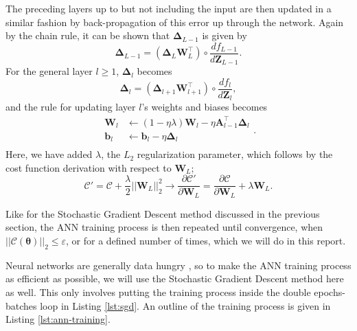 \documentclass[]{article}
\begin{document}
The preceding layers up to but not including the input are then updated in a similar fashion by back-propagation of this error up through the network. Again by the chain rule, it can be shown that $\mathbf{\Delta}_{L-1}$ is given by
\begin{equation}
	\mathbf{\Delta}_{L-1} = (\mathbf{\Delta}_L \mathbf{W}_L^\intercal) \circ \frac{df_{L-1}}{d\mathbf{Z}_{L-1}}.
\end{equation}
For the general layer $l \ge 1$, $\mathbf{\Delta}_l$ becomes
\begin{equation} \label{update-deltas}
	\mathbf{\Delta}_{l} = (\mathbf{\Delta}_{l+1} \mathbf{W}_{l+1}^\intercal) \circ \frac{df_l}{d\mathbf{Z}_l},
\end{equation}
and the rule for updating layer $l$'s weights and biases becomes
\begin{equation} \label{update-weights-biases}
\begin{aligned}
	\mathbf{W}_l &\leftarrow (1 - \eta \lambda) \mathbf{W}_l - \eta \mathbf{A}_{l-1}^\intercal \mathbf{\Delta}_l \\
	\mathbf{b}_l &\leftarrow \mathbf{b}_l - \eta \mathbf{\Delta}_l \\
\end{aligned}.
\end{equation}
Here, we have added $\lambda$, the $L_2$ regularization parameter, which follows by the cost function derivation with respect to $\mathbf{W}_L$;
\begin{equation}
	\mathcal{C}' = \mathcal{C} + \frac{\lambda}{2} ||\mathbf{W}_L||_2^2 \rightarrow \frac{\partial \mathcal{C}'}{\partial \mathbf{W}_L} = \frac{\partial \mathcal{C}}{\partial \mathbf{W}_L} + \lambda \mathbf{W}_L.
\end{equation}

\vspace{5mm}

Like for the Stochastic Gradient Descent method discussed in the previous section, the ANN training process is then repeated until convergence, when $||\mathcal{C}(\mathbf{\theta})||_2 \le \varepsilon$, or for a defined number of times, which we will do in this report.

\vspace{5mm}

Neural networks are generally data hungry \cite{fys-stk4155-notes}, so to make the ANN training process as efficient as possible, we will use the Stochastic Gradient Descent method here as well. This only involves putting the training process inside the double epochs-batches loop in Listing \ref{lst:sgd}. An outline of the training process is given in Listing \ref{lst:ann-training}.
\end{document}
